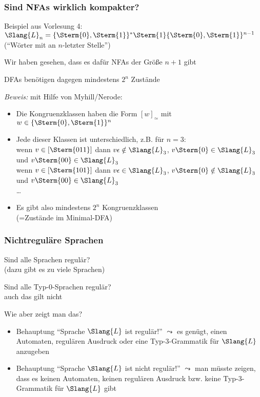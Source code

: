 \documentclass[aspectratio=1610,onlymath]{beamer}
\begin{document}
\begin{frame}\frametitle{Sind NFAs wirklich kompakter?}

Beispiel aus Vorlesung 4:
$\Slang{L}_n= \{\Sterm{0},\Sterm{1}\}^* \Sterm{1} \{\Sterm{0},\Sterm{1}\}^{n-1}$
("`Wörter mit  an $n$-letzter Stelle"')
\bigskip

Wir haben gesehen, dass es dafür NFAs der Größe $n+1$ gibt
\bigskip

DFAs benötigen dagegen mindestens $2^n$ Zustände\pause
\bigskip

\emph{Beweis:} mit Hilfe von Myhill/Nerode:
\begin{itemize}
\item Die Kongruenzklassen haben die Form $[w]_\simeq$ mit $w\in\{\Sterm{0},\Sterm{1}\}^n$
\item Jede dieser Klassen ist unterschiedlich, z.B. für $n=3$:\\
wenn $v\in[\Sterm{011}]$ dann $v\epsilon\notin\Slang{L}_3$, $v\Sterm{0}\in\Slang{L}_3$ und $v\Sterm{00}\in\Slang{L}_3$\\
wenn $v\in[\Sterm{101}]$ dann $v\epsilon\in\Slang{L}_3$, $v\Sterm{0}\notin\Slang{L}_3$ und $v\Sterm{00}\in\Slang{L}_3$\\
\ldots
\item Es gibt also mindestens $2^n$ Kongruenzklassen\\(=Zustände im Minimal-DFA)
\end{itemize}

\end{frame}


\begin{frame}\frametitle{Nichtreguläre Sprachen}

Sind alle Sprachen regulär?\\\pause
{} (dazu gibt es zu viele Sprachen)\pause
\bigskip

Sind alle Typ-0-Sprachen regulär?\\\pause
{} auch das gilt nicht
\bigskip

\alert{Wie aber zeigt man das?}
\begin{itemize}
\item Behauptung "`Sprache $\Slang{L}$ ist regulär!"' $\leadsto$ es genügt, \alert{einen} Automaten, regulären Ausdruck oder eine Typ-3-Grammatik für $\Slang{L}$ anzugeben
\item Behauptung "`Sprache $\Slang{L}$ ist nicht regulär!"' $\leadsto$ man müsste zeigen, dass es \alert{keinen} Automaten, \alert{keinen} regulären Ausdruck bzw. \alert{keine} Typ-3-Grammatik für $\Slang{L}$ gibt
\end{itemize}

\end{frame}
\end{document}
